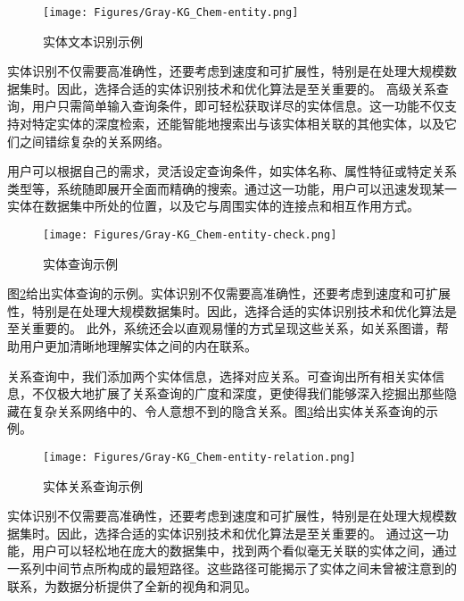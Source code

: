 \begin{figure}[h!]
\centering
\texttt{[image: Figures/Gray-KG\_Chem-entity.png]}
\caption{\small\textrm{实体文本识别示例}}%
\label{Fig:KG-Chem_entity}
\end{figure}
实体识别不仅需要高准确性，还要考虑到速度和可扩展性，特别是在处理大规模数据集时。因此，选择合适的实体识别技术和优化算法是至关重要的。
高级关系查询，用户只需简单输入查询条件，即可轻松获取详尽的实体信息。这一功能不仅支持对特定实体的深度检索，还能智能地搜索出与该实体相关联的其他实体，以及它们之间错综复杂的关系网络。

用户可以根据自己的需求，灵活设定查询条件，如实体名称、属性特征或特定关系类型等，系统随即展开全面而精确的搜索。通过这一功能，用户可以迅速发现某一实体在数据集中所处的位置，以及它与周围实体的连接点和相互作用方式。

\begin{figure}[h!]
\centering
\texttt{[image: Figures/Gray-KG\_Chem-entity-check.png]}
\caption{\small\textrm{实体查询示例}}%
\label{Fig:KG-Chem_entity_check}
\end{figure}
图\ref{Fig:KG-Chem_entity_check}给出实体查询的示例。实体识别不仅需要高准确性，还要考虑到速度和可扩展性，特别是在处理大规模数据集时。因此，选择合适的实体识别技术和优化算法是至关重要的。
此外，系统还会以直观易懂的方式呈现这些关系，如关系图谱，帮助用户更加清晰地理解实体之间的内在联系。

关系查询中，我们添加两个实体信息，选择对应关系。可查询出所有相关实体信息，不仅极大地扩展了关系查询的广度和深度，更使得我们能够深入挖掘出那些隐藏在复杂关系网络中的、令人意想不到的隐含关系。图\ref{Fig:KG-Chem_entity_relation}给出实体关系查询的示例。

\begin{figure}[h!]
\centering
\texttt{[image: Figures/Gray-KG\_Chem-entity-relation.png]}
\caption{\small\textrm{实体关系查询示例}}%
\label{Fig:KG-Chem_entity_relation}
\end{figure}
实体识别不仅需要高准确性，还要考虑到速度和可扩展性，特别是在处理大规模数据集时。因此，选择合适的实体识别技术和优化算法是至关重要的。
通过这一功能，用户可以轻松地在庞大的数据集中，找到两个看似毫无关联的实体之间，通过一系列中间节点所构成的最短路径。这些路径可能揭示了实体之间未曾被注意到的联系，为数据分析提供了全新的视角和洞见。

